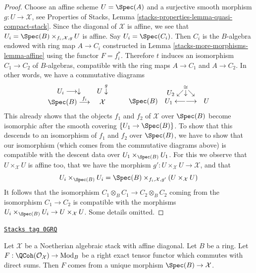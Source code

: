 \begin{proof}
Choose an affine scheme $U = \Spec(A)$ and a surjective smooth
morphism $g : U \to \mathcal{X}$, see
Properties of Stacks, Lemma \ref{stacks-properties-lemma-quasi-compact-stack}.
Since the diagonal of $\mathcal{X}$ is affine, we see that
$U_i = \Spec(B) \times_{f_i, \mathcal{X}, g} U$ is affine.
Say $U_i = \Spec(C_i)$. Then $C_i$ is the $B$-algebra endowed
with ring map $A \to C_i$ constructed in Lemma \ref{stacks-more-morphisms-lemma-affine}
using the functor $F = f_i^*$. Therefore $t$ induces an isomorphism
$C_1 \to C_2$ of $B$-algebras, compatible with the ring maps
$A \to C_1$ and $A \to C_2$. In other words, we have a commutative
diagrams
$$
\begin{array}{cc}U_i \longrightarrow\downarrow & U \overset{g}{\downarrow} \\ \Spec(B) \overset{f_i}{\longrightarrow} & \mathcal{X}\end{array}
\quad\quad
\begin{array}{ccc} & U_2 \swarrow\overset{\cong}{\downarrow}\searrow &  \\ \Spec(B) & U_1 \longleftarrow\longrightarrow & U\end{array}
$$
This already shows that the objects $f_1$ and $f_2$ of $\mathcal{X}$
over $\Spec(B)$ become isomorphic after the smooth covering
$\{U_1 \to \Spec(B)\}$. To show that this descends to an isomorphism
of $f_1$ and $f_2$ over $\Spec(B)$, we have to show that our isomorphism
(which comes from the commutative diagrams above) is compatible
with the descent data over $U_1 \times_{\Spec(B)} U_1$. For this
we observe that $U \times_\mathcal{X} U$ is affine too, that
we have the morphism $g' : U \times_\mathcal{X} U \to \mathcal{X}$, and
that
$$
U_i \times_{\Spec(B)} U_i =
\Spec(B) \times_{f_i, \mathcal{X}, g'}
(U \times_\mathcal{X} U)
$$
It follows that the isomorphism $C_1 \otimes_B C_1 \to C_2 \otimes_B C_2$
coming from the isomorphism $C_1 \to C_2$ is compatible with the
morphisms $U_i \times_{\Spec(B)} U_i \to U \times_\mathcal{X} U$.
Some details omitted.
\end{proof}

\begin{lemma}[Main]
\label{stacks-more-morphisms-lemma-main}
\href{https://stacks.math.columbia.edu/tag/0GRQ}{\texttt{Stacks tag 0GRQ}}

Let $\mathcal{X}$ be a Noetherian algebraic stack with affine diagonal.
Let $B$ be a ring.
Let $F : \QCoh(\mathcal{O}_\mathcal{X}) \to \text{Mod}_B$
be a right exact tensor functor which commutes with direct sums.
Then $F$ comes from a unique morphism $\Spec(B) \to \mathcal{X}$.
\end{lemma}

